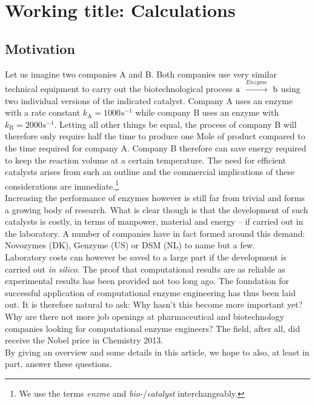 \chapter[Working title: Calculations]
{Working title: Calculations\label{ch1}}


\section{Motivation}\label{sec:mot}
Let us imagine two companies A and B.
Both companies use very similar technical equipment to carry out the biotechnological process $\ce{a}$ $\xrightarrow{Enzyme}$ $\ce{b}$ using two individual versions of the indicated catalyst.
Company A uses an enzyme with a rate constant $k_\text{A} = 1000s^{-1}$ while company B uses an enzyme with $k_\text{B} = 2000s^{-1}$.
Letting all other things be equal, the process of company B will therefore only require half the time to produce one Mole of product compared to the time required for company A.
Company B therefore can save energy required to keep the reaction volume at a certain temperature.
The need for efficient catalysts arises from such an outline and the commercial implications of these considerations are immediate.\footnote{We use the terms \textit{enzme} and \textit{bio-}/\textit{catalyst} interchangeably.}\\
Increasing the performance of enzymes however is still far from trivial and forms a growing body of research.
What is clear though is that the development of such catalysts is costly, in terms of manpower, material and energy -- if carried out in the laboratory.
A number of companies have in fact formed around this demand: Novozymes (DK), Genzyme (US) or DSM (NL) to name but a few\cite{meyer2013use, kirk2002industrial, beilen2002enzyme, schmid2002use}.\\
Laboratory costs can however be saved to a large part if the development is carried out \textit{in silico}.
The proof that computational results are as reliable as experimental results has been provided not too long ago\cite{claeyssens2006high}.
The foundation for successful application of computational enzyme engineering has thus been laid out.
It is therefore natural to ask: Why hasn't this become more important yet?
Why are there not more job openings at pharmaceutical and biotechnology companies looking for computational enzyme engineers?
The field, after all, did receive the Nobel price in Chemistry 2013.\\
By giving an overview and some details in this article, we hope to also, at least in part, answer these questions.


